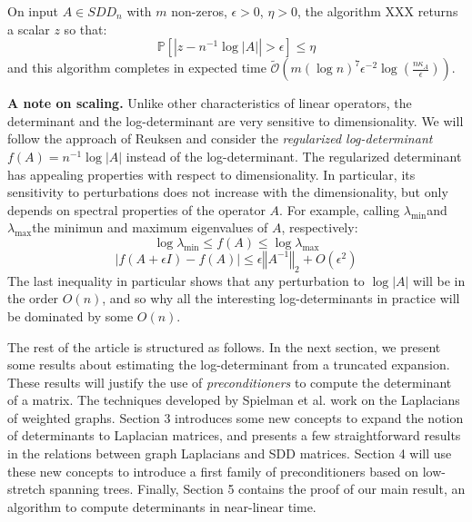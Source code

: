 \begin{theorem}\label{thm:ultra_main}On input $A\in SDD_{n}$ with
$m$ non-zeros, $\epsilon>0$, $\eta>0$, the algorithm XXX returns
a scalar $z$ so that:
\[
\mathbb{P}\left[\left|z-n^{-1}\log\left|A\right|\right|>\epsilon\right]\leq\eta
\]
and this algorithm completes in expected time $\tilde{\mathcal{O}}\left(m\left(\log n\right)^{7}\epsilon^{-2}\log\left(\frac{n\kappa_{A}}{\epsilon}\right)\right)$.

\end{theorem}

\textbf{A note on scaling.} Unlike other characteristics of linear
operators, the determinant and the log-determinant are very sensitive
to dimensionality. We will follow the approach of Reuksen \cite{Reusken2002}
and consider the \emph{regularized log-determinant} $f\left(A\right)=n^{-1}\log\left|A\right|$
instead of the log-determinant. The regularized determinant has appealing
properties with respect to dimensionality. In particular, its sensitivity
to perturbations does not increase with the dimensionality, but only
depends on spectral properties of the operator $A$. For example,
calling $\lambda_{\min}$and $\lambda_{\max}$the minimun and maximum
eigenvalues of $A$, respectively: 
\[
\log\lambda_{\min}\leq f\left(A\right)\leq\log\lambda_{\max}
\]
\[
\left|f\left(A+\epsilon I\right)-f\left(A\right)\right|\leq\epsilon\left\Vert A^{-1}\right\Vert _{2}+O\left(\epsilon^{2}\right)
\]
The last inequality in particular shows that any perturbation to $\log\left|A\right|$
will be in the order $O\left(n\right)$, and so why all the interesting
log-determinants in practice will be dominated by some $O\left(n\right)$.

The rest of the article is structured as follows. In the next section,
we present some results about estimating the log-determinant from
a truncated expansion. These results will justify the use of \emph{preconditioners
}to compute the determinant of a matrix. The techniques developed
by Spielman et al. work on the Laplacians of weighted graphs. Section
3 introduces some new concepts to expand the notion of determinants
to Laplacian matrices, and presents a few straightforward results
in the relations between graph Laplacians and SDD matrices. Section
4 will use these new concepts to introduce a first family of preconditioners
based on low-stretch spanning trees. Finally, Section 5 contains the
proof of our main result, an algorithm to compute determinants in
near-linear time.
